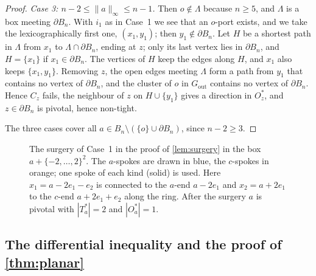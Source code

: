 \documentclass[11pt,letterpaper]{article}
\begin{document}
\begin{proof}
\emph{Case 3: $n-2\le\|a\|_\infty\le n-1$.} Then $o\notin\Lambda$ because $n\ge5$, and $\Lambda$ is a box meeting $\partial B_n$. With $i_1$ as in Case~1 we see that an $o$-port exists, and we take the lexicographically first one, $(x_1,y_1)$; then $y_1\notin\partial B_n$. Let $H$ be a shortest path in $\Lambda$ from $x_1$ to $\Lambda\cap\partial B_n$, ending at $z$; only its last vertex lies in $\partial B_n$, and $H=\{x_1\}$ if $x_1\in\partial B_n$. The vertices of $H$ keep the edges along $H$, and $x_1$ also keeps $\{x_1,y_1\}$. Removing $z$, the open edges meeting $\Lambda$ form a path from $y_1$ that contains no vertex of $\partial B_n$, and the cluster of $o$ in $G_{\mathrm{out}}$ contains no vertex of $\partial B_n$. Hence $C_z$ fails, the neighbour of $z$ on $H\cup\{y_1\}$ gives a direction in $O_z^*$, and $z\in\partial B_n$ is pivotal, hence non-tight.

The three cases cover all $a\in B_n\setminus(\{o\}\cup\partial B_n)$, since $n-2\ge3$.
\end{proof}

\begin{figure}[ht]
\centering
{}
\caption{The surgery of Case~1 in the proof of \cref{lem:surgery} in the box $a+\{-2,\dots,2\}^2$. The $a$-spokes are drawn in blue, the $c$-spokes in orange; one spoke of each kind (solid) is used. Here $x_1=a-2e_1-e_2$ is connected to the $a$-end $a-2e_1$ and $x_2=a+2e_1$ to the $c$-end $a+2e_1+e_2$ along the ring. After the surgery $a$ is pivotal with $|T_a^*|=2$ and $|O_a^*|=1$.}\label{fig:surgery}
\end{figure}

\subsection{The differential inequality and the proof of \texorpdfstring{\cref{thm:planar}}{the planar upper bound}}
\end{document}
